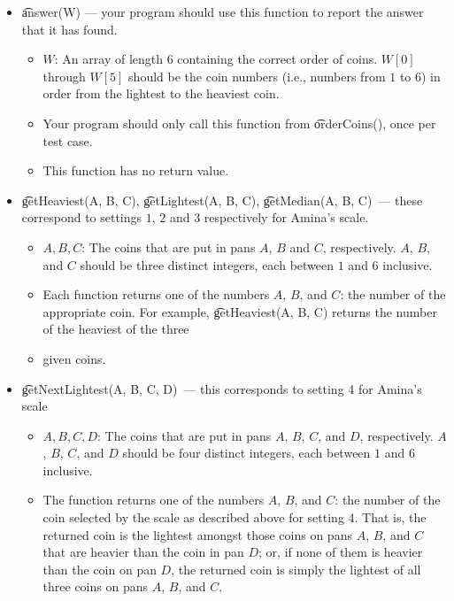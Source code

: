 \begin{itemize}
    \item \t{answer(W)} --- your program should use this function to report the answer that it has found.
    \begin{itemize}
        \item $W$: An array of length $6$ containing the correct order of coins. $W[0]$ through $W[5]$ should be the coin numbers (i.e., numbers from $1$ to $6$) in order from the lightest to the heaviest coin.
        \item Your program should only call this function from \t{orderCoins()}, once per test case.
        \item This function has no return value.
    \end{itemize}
    \item \t{getHeaviest(A, B, C)}, \t{getLightest(A, B, C)}, \t{getMedian(A, B, C)}~--- these correspond to settings $1$, $2$ and $3$ respectively for Amina's scale.
    \begin{itemize}
        \item $A, B, C$: The coins that are put in pans $A$, $B$ and $C$, respectively. $A$, $B$, and $C$ should be three distinct integers, each between $1$ and $6$ inclusive.
        \item Each function returns one of the numbers $A$, $B$, and $C$: the number of the appropriate coin. For example, \t{getHeaviest(A, B, C)} returns the number of the heaviest of the three
        \item given coins.
    \end{itemize}
    \item \t{getNextLightest(A, B, C, D)}~--- this corresponds to setting 4 for Amina's scale
    \begin{itemize}
    \item $A, B, C, D$: The coins that are put in pans $A$, $B$, $C$, and $D$, respectively. $A$, $B$, $C$, and $D$ should be four distinct integers, each between $1$ and $6$ inclusive.
    \item The function returns one of the numbers $A$, $B$, and $C$: the number of the coin selected by the scale as described above for setting $4$. That is, the returned coin is the lightest amongst those coins on pans $A$, $B$, and $C$ that are heavier than the coin in pan $D$; or, if none of them is heavier than the coin on pan $D$, the returned coin is simply the lightest of all three coins on pans $A$, $B$, and $C$.
    \end{itemize}
\end{itemize}